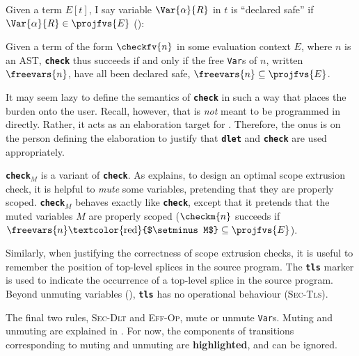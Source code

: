 Given a term $E[t]$, I say variable $\Var{\alpha}{R}$ in $t$ is ``declared safe'' if $\Var{\alpha}{R} \in \projfvs{E}$ ():

Given a term of the form $\checkfv{n}$ in some evaluation context $E$, where $n$ is an AST, \textbf{\texttt{check}} thus succeeds if and only if the free \texttt{Var}s of $n$, written $\freevars{n}$, have all been declared safe, $\freevars{n} \subseteq \projfvs{E}$. 

It may seem lazy to define the semantics of \textbf{\texttt{check}} in such a way that places the burden onto the user. Recall, however, that \coreLang{} is \textit{not} meant to be programmed in directly. Rather, it acts as an elaboration target for \sourceLang{}. Therefore, the onus is on the person defining the elaboration to justify that \textbf{\texttt{dlet}} and \textbf{\texttt{check}} are used appropriately. 

\textbf{\texttt{check}}$_M$ is a variant of \textbf{\texttt{check}}. As  explains, to design an optimal scope extrusion check, it is helpful to \textit{mute} some variables, pretending that they are properly scoped. \textbf{\texttt{check}}$_M$ behaves exactly like \textbf{\texttt{check}}, except that it pretends that the muted variables $M$ are properly scoped ($\checkm{n}$ succeeds if $\freevars{n} \text{\textcolor{red}{$\setminus M$}} \subseteq \projfvs{E}$).

Similarly, when justifying the correctness of scope extrusion checks, it is useful to remember the position of top-level splices in the \sourceLang{} source program. The \textbf{\texttt{tls}} marker is used to indicate the occurrence of a top-level splice in the source program. Beyond unmuting variables (), \textbf{\texttt{tls}} has no operational behaviour (\textsc{Sec-Tls}).

The final two rules, \textsc{Sec-Dlt} and \textsc{Eff-Op}, mute or unmute \texttt{Var}s. Muting and unmuting are explained in . For now, the components of transitions corresponding to muting and unmuting are \textbf{\textcolor{coreHighlight}{highlighted}}, and can be ignored. 

